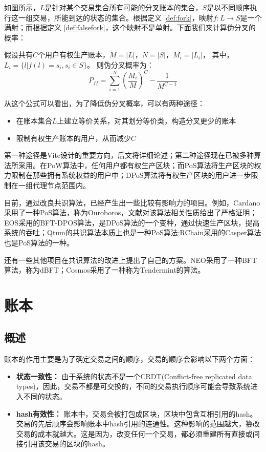 \documentclass[UTF8,nofonts]{ctexart}
\begin{document}
\begin{multicols}{2}
如图所示，$L$是针对某个交易集合所有可能的分叉账本的集合，$S$是以不同顺序执行这一组交易，所能到达的状态的集合。根据定义 \ref{def:fork}，映射$f: L \rightarrow S$是一个满射；而根据定义 \ref{def:falsefork}，这个映射不是单射。下面我们来计算伪分叉的概率：

假设共有$C$个用户有权生产账本，$M = \vert L \vert$，$N = \vert S \vert$，$M_{i} = \vert L_{i} \vert$， 其中，$L_{i} = \lbrace l \vert f(l) = s_{i}, s_{i} \in S \rbrace$。
则伪分叉概率为：
\begin{equation}
P_{ff} = \sum_{i=1}^{N}\left ( \frac{M_{i}}{M} \right )^{C} - \frac{1}{M^{C-1}}
\end{equation}

从这个公式可以看出，为了降低伪分叉概率，可以有两种途径：
\begin{itemize}
	\item 在账本集合$L$上建立等价关系，对其划分等价类，构造分叉更少的账本
	\item 限制有权生产账本的用户，从而减少$C$
\end{itemize}

第一种途径是Vite设计的重要方向，后文将详细论述；第二种途径现在已被多种算法所采用。在PoW算法中，任何用户都有权生产区块；而PoS算法将生产区块的权力限制在那些拥有系统权益的用户中；DPoS算法\cite{dpos}将有权生产区块的用户进一步限制在一组代理节点范围内。
	
目前，通过改良共识算法，已经产生出一些比较有影响力的项目。例如，Cardano采用了一种PoS算法，称为Ouroboros，文献\cite{bernardo2017ouroboros}对该算法相关性质给出了严格证明；EOS采用的BFT-DPOS算法，是DPoS算法的一个变种，通过快速生产区块，提高系统的吞吐；Qtum\cite{dai2017smart}的共识算法本质上也是一种PoS算法;RChain采用的Casper算法也是PoS算法的一种。

还有一些其他项目在共识算法的改进上提出了自己的方案。NEO采用了一种BFT算法，称为dBFT；Cosmos采用了一种称为Tendermint\cite{tendermint}的算法。

\section{账本}
\subsection{概述}
账本的作用主要是为了确定交易之间的顺序，交易的顺序会影响以下两个方面：
\begin{itemize}
	\item \textbf{状态一致性：} 由于系统的状态不是一个CRDT(Conflict-free replicated data types)\cite{crdt}，因此，交易不都是可交换的，不同的交易执行顺序可能会导致系统进入不同的状态。
	\item \textbf{hash有效性：} 账本中，交易会被打包成区块，区块中包含互相引用的hash。交易的先后顺序会影响账本中hash引用的连通性。这种影响的范围越大，篡改交易的成本就越大。这是因为，改变任何一个交易，都必须重建所有直接或间接引用该交易的区块的hash。
\end{itemize}


\end{multicols}
\end{document}
